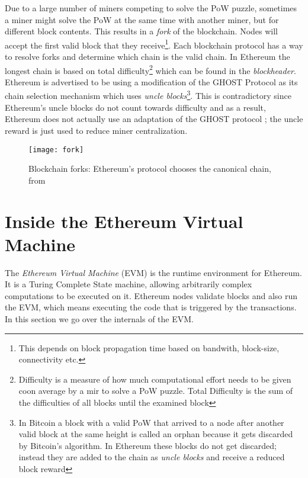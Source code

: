 Due to a large number of miners competing to solve the PoW puzzle, sometimes a miner might solve the PoW at the same time with another miner, but for different block contents. This results in a \textit{fork} of the blockchain. Nodes will accept the first valid block that they receive\footnote{This depends on block propagation time based on bandwith, block-size, connectivity etc.}. Each blockchain protocol has a way to resolve forks and determine which chain is the valid chain. In Ethereum the longest chain is based on total difficulty\footnote{Difficulty is a measure of how much computational effort needs to be given coon average by a mir to solve a PoW puzzle. Total Difficulty is the sum of the difficulties of all blocks until the examined block} which can be found in the \textit{blockheader}. Ethereum is advertised to be using a modification of the GHOST Protocol\cite{GHOST} as its chain selection mechanism which uses \textit{uncle blocks}\footnote{In Bitcoin a block with a valid PoW that arrived to a node after another valid block at the same height is called an orphan because it gets discarded by Bitcoin's algorithm. In Ethereum these blocks do not get discarded; instead they are added to the chain as \textit{uncle blocks} and receive a reduced block reward}. This is contradictory since Ethereum's uncle blocks do not count towards difficulty and as a result, Ethereum does not actually use an adaptation of the GHOST protocol \cite{Gervais:2016:SPP:2976749.2978341}; the uncle reward is just used to reduce miner centralization.

\begin{figure}[H]
    \centering
    \texttt{[image: fork]}
    \caption{Blockchain forks: Ethereum's protocol chooses the canonical chain, from \cite{preethi}}
    \label{fig:forking}
\end{figure}

\section{Inside the Ethereum Virtual Machine}
The \textit{Ethereum Virtual Machine} (EVM) is the runtime environment for Ethereum. It is a Turing Complete State machine, allowing arbitrarily complex computations to be executed on it. Ethereum nodes validate blocks and also run the EVM, which means executing the code that is triggered by the transactions. In this section we go over the internals of the EVM\@. 

